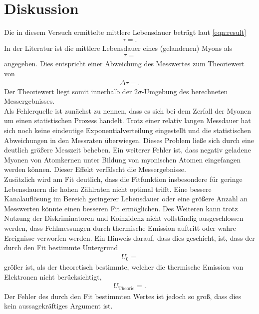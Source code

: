 \section{Diskussion}
\label{sec:Diskussion}

Die in diesem Versuch ermittelte mittlere Lebensdauer beträgt laut \eqref{eqn:result}
\begin{align*}
  \tau = .
\end{align*}
In der Literatur \cite{Agashe:2014kda} ist die mittlere Lebensdauer eines (gelandenen) Myons als
\begin{align*}
  \tau = 
\end{align*}
angegeben.
Dies entspricht einer Abweichung des Messwertes zum Theoriewert von
\begin{align*}
  \Delta \tau = .
\end{align*}
Der Theoriewert liegt somit innerhalb der $2\sigma$-Umgebung des berechneten Messergebnisses.\\
Als Fehlerquelle ist zunächst zu nennen, dass es sich bei dem Zerfall der Myonen um einen statistischen Prozess handelt.
Trotz einer relativ langen Messdauer hat sich noch keine eindeutige Exponentialverteilung eingestellt und die statistischen Abweichungen in den Messraten überwiegen.
Dieses Problem ließe sich durch eine deutlich größere Messzeit beheben.
Ein weiterer Fehler ist, dass negativ geladene Myonen von Atomkernen unter Bildung von myonischen Atomen eingefangen werden können.
Dieser Effekt verfälscht die Messergebnisse.\\

Zusätzlich wird am Fit deutlich, dass die Fitfunktion insbesondere für geringe Lebensdauern die hohen Zählraten nicht optimal trifft.
Eine bessere Kanalauflösung im Bereich geringerer Lebensdauer oder eine größere Anzahl an Messwerten könnte einen besseren Fit ermöglichen.
Des Weiteren kann trotz Nutzung der Diskriminatoren und Koinzidenz nicht vollständig ausgeschlossen werden, dass Fehlmessungen durch thermische Emission auftritt oder wahre Ereignisse verworfen werden.
Ein Hinweis darauf, dass dies geschieht, ist, dass der durch den Fit bestimmte Untergrund
\begin{align*}
  U_0 = 
\end{align*}
größer ist, als der theoretisch bestimmte, welcher die thermische Emission von Elektronen nicht berücksichtigt,
\begin{align*}
  U_{\text{Theorie}} = .
\end{align*}
Der Fehler des durch den Fit bestimmten Wertes ist jedoch so groß, dass dies kein aussagekräftiges Argument ist.
